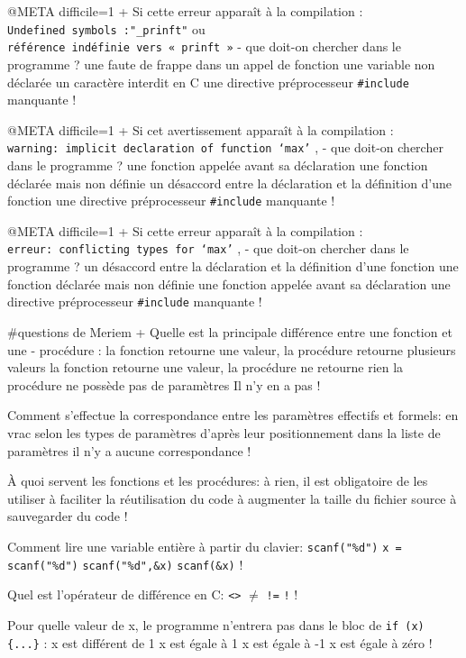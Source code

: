 @META difficile=1
+ Si cette erreur apparaît à la compilation : \\
 \verb+Undefined symbols :"_prinft"+ ou \\
 \verb+référence indéfinie vers « prinft »+
- que doit-on chercher dans le programme ?
  une faute de frappe dans un appel de fonction
  une variable non déclarée
  un caractère interdit en C
  une directive préprocesseur \verb+#include+ manquante
!

@META difficile=1
+ Si cet avertissement apparaît à la compilation : \\
 \verb+warning: implicit declaration of function ‘max’+ , 
- que doit-on chercher dans le programme ?
  une fonction appelée avant sa déclaration
  une fonction déclarée mais non définie
  un désaccord entre la déclaration et la définition d'une fonction
  une directive préprocesseur \verb+#include+ manquante
!

@META difficile=1
+ Si cette erreur apparaît à la compilation : \\
  \verb+erreur: conflicting types for ‘max’+ , 
- que doit-on chercher dans le programme ?
  un désaccord entre la déclaration et la définition d'une fonction
  une fonction déclarée mais non définie
  une fonction appelée avant sa déclaration
  une directive préprocesseur \verb+#include+ manquante
!

#questions de Meriem
+  Quelle est la principale différence entre une fonction et une 
- procédure :
 la fonction retourne une valeur, la procédure retourne plusieurs valeurs 
 la fonction retourne une valeur, la procédure ne retourne rien 
  la procédure ne possède pas de paramètres
  Il n'y en a pas
!

Comment s'effectue la correspondance entre  les paramètres effectifs et formels:
 en vrac
 selon les types de paramètres
 d'après leur positionnement dans la liste de paramètres
 il n'y a aucune correspondance
!

À quoi servent les fonctions et les procédures:
 à rien, il est obligatoire de les utiliser 
 à faciliter la réutilisation du code
 à augmenter la taille du fichier source
 à sauvegarder du code
!

Comment lire une variable entière à partir du clavier:
 \verb|scanf("%d")|
 \verb|x = scanf("%d")|
 \verb|scanf("%d",&x)|
 \verb|scanf(&x)|
!

Quel est l'opérateur de différence en C:
 \verb|<>|
 \texttt{$\neq$}
 \verb|!=|
 \verb|!|
!

Pour quelle valeur de x, le programme n'entrera pas dans le bloc de \verb|if (x) {...}| :
 x est différent de 1
 x est égale à 1
 x est égale à -1
 x est égale à zéro
!

